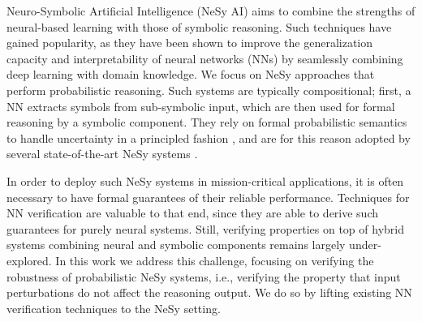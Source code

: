 Neuro-Symbolic Artificial Intelligence (NeSy AI) \cite{hitzler2022neuro,marra2024statistical} aims to combine the strengths of neural-based learning with those of symbolic reasoning. Such techniques have gained popularity, as they have been shown to improve the generalization capacity and interpretability of neural networks (NNs) by seamlessly combining deep learning with domain knowledge. We focus on NeSy approaches that perform probabilistic reasoning. Such systems are typically compositional; first, a NN extracts symbols from sub-symbolic input, which are then used for formal reasoning by a symbolic component. They rely on formal probabilistic semantics to handle uncertainty in a principled fashion \cite{marra2024statistical}, and are for this reason adopted by several state-of-the-art NeSy systems \cite{manhaeve2018deepproblog,winters2022deepstochlog}. 


In order to deploy such NeSy systems in mission-critical applications, it is often necessary to have formal guarantees of their reliable performance. Techniques for NN verification are valuable to that end, since they are able to derive such guarantees for purely neural systems. Still, verifying properties on top of hybrid systems combining neural and symbolic components remains largely under-explored. In this work we address this challenge, focusing on verifying the robustness of probabilistic NeSy systems, i.e., verifying the property that input perturbations do not affect the reasoning output. We do so by lifting existing NN verification techniques to the NeSy setting.

